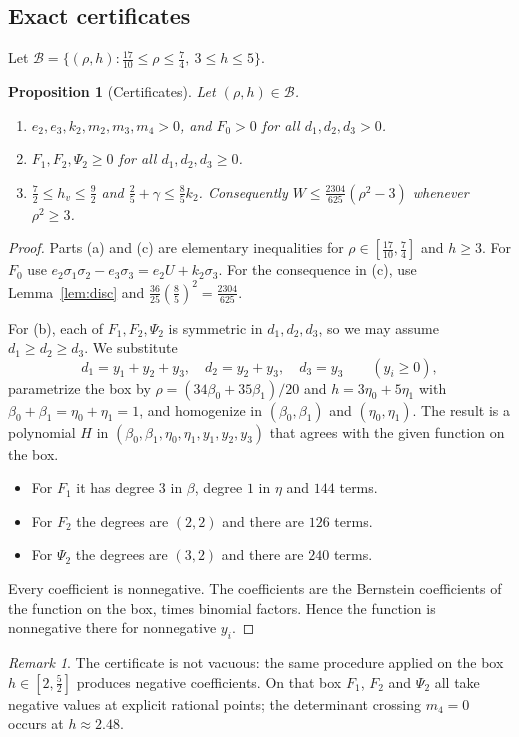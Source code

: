 \documentclass[11pt,a4paper]{article}
\theoremstyle{plain}
\newtheorem{proposition}[theorem]{Proposition}
\theoremstyle{definition}
\theoremstyle{remark}
\newtheorem{remark}[theorem]{Remark}
\newcommand{\cB}{\mathcal{B}}
\begin{document}
\subsection{Exact certificates}
Let $\cB=\{(\rho,h):\tfrac{17}{10}\le\rho\le\tfrac74,\ 3\le h\le5\}$.

\begin{proposition}[Certificates]\label{prop:cert}
Let $(\rho,h)\in\cB$.
\begin{enumerate}[label=(\alph*)]
\item $e_2,e_3,k_2,m_2,m_3,m_4>0$, and $F_0>0$ for all $d_1,d_2,d_3>0$.
\item $F_1,F_2,\Psi_2\ge0$ for all $d_1,d_2,d_3\ge0$.
\item $\tfrac72\le h_v\le\tfrac92$ and $\tfrac25+\gamma\le\tfrac85k_2$. Consequently
$W\le\tfrac{2304}{625}(\rho^2-3)$ whenever $\rho^2\ge3$.
\end{enumerate}
\end{proposition}
\begin{proof}
Parts (a) and (c) are elementary inequalities for $\rho\in[\tfrac{17}{10},\tfrac74]$ and
$h\ge3$. For $F_0$ use $e_2\sigma_1\sigma_2-e_3\sigma_3=e_2U+k_2\sigma_3$. For the consequence
in (c), use Lemma~\ref{lem:disc} and $\tfrac{36}{25}(\tfrac85)^2=\tfrac{2304}{625}$.

For (b), each of $F_1,F_2,\Psi_2$ is symmetric in $d_1,d_2,d_3$, so we may assume
$d_1\ge d_2\ge d_3$. We substitute
\[
d_1=y_1+y_2+y_3,\quad d_2=y_2+y_3,\quad d_3=y_3\qquad(y_i\ge0),
\]
parametrize the box by $\rho=(34\beta_0+35\beta_1)/20$ and $h=3\eta_0+5\eta_1$ with
$\beta_0+\beta_1=\eta_0+\eta_1=1$, and homogenize in $(\beta_0,\beta_1)$ and
$(\eta_0,\eta_1)$. The result is a polynomial $H$ in
$(\beta_0,\beta_1,\eta_0,\eta_1,y_1,y_2,y_3)$ that agrees with the given function on
the box.
\begin{itemize}
\item For $F_1$ it has degree $3$ in $\beta$, degree $1$ in $\eta$ and $144$ terms.
\item For $F_2$ the degrees are $(2,2)$ and there are $126$ terms.
\item For $\Psi_2$ the degrees are $(3,2)$ and there are $240$ terms.
\end{itemize}
Every coefficient is nonnegative. The coefficients are the Bernstein coefficients of the
function on the box, times binomial factors. Hence the function is nonnegative there
for nonnegative $y_i$.
\end{proof}

\begin{remark}\label{rem:control}
The certificate is not vacuous: the same procedure applied on the box
$h\in[2,\tfrac52]$ produces negative coefficients. On that box $F_1$, $F_2$ and $\Psi_2$
all take negative values at explicit rational points; the determinant crossing $m_4=0$
occurs at $h\approx2.48$.
\end{remark}
\end{document}
